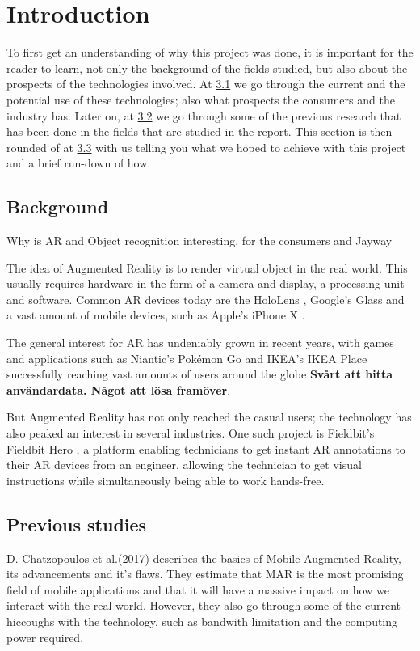 \section{Introduction}
To first get an understanding of why this project was done, it is important for the reader to learn, not only the background of the fields studied, but also about the prospects of the technologies involved.
 At \hyperref[subsecBackground]{3.1} we go through the current and the potential use of these technologies; also what prospects the consumers and the industry has. Later on, at  \hyperref[subsecPrevStud]{3.2} we go through some of the previous research that has been done in the fields that are studied in the report. This section is then rounded of at \hyperref[subsecGoal]{3.3} with us telling you what we hoped to achieve with this project and a brief run-down of how.

\subsection{Background}
\label{subsecBackground}
Why is AR and Object recognition interesting, for the consumers and Jayway

The idea of Augmented Reality is to render virtual object in the real world. This usually requires hardware in the form of a camera and display, a processing unit and software. Common AR devices today are the HoloLens \cite{microsoft}, Google's Glass \cite{googleGlasses} and a vast amount of mobile devices, such as Apple's iPhone X \cite{appleAR}. 

The general interest for AR has undeniably grown in recent years, with games and applications such as Niantic's Pokémon Go \cite{pokemonGO} and IKEA's IKEA Place \cite{IKEAPlace} successfully reaching vast amounts of users around the globe \textbf{Svårt att hitta användardata. Något att lösa framöver}.

 But Augmented Reality has not only reached the casual users; the technology has also peaked an interest in several industries. One such project is Fieldbit's Fieldbit Hero \cite{fieldbit}, a platform enabling technicians to get instant AR annotations to their AR devices from an engineer, allowing the technician to get visual instructions while simultaneously  being able to work hands-free. 

\subsection{Previous studies}
\label{subsecPrevStud}
D. Chatzopoulos et al.(2017) describes the basics of Mobile Augmented Reality, its advancements and it's flaws. They estimate that MAR is the most promising field of mobile applications and that it will have a massive impact on how we interact with the real world. However, they also go through some of the current hiccoughs with the technology, such as bandwith limitation and the computing power required. 
\cite{MARS}

